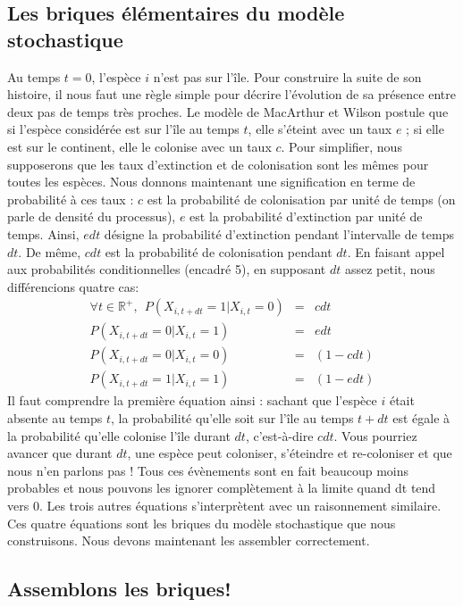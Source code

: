 \subsection{Les briques élémentaires du modèle stochastique}
Au temps $t=0$, l'espèce $i$ n'est pas sur l'île. Pour construire la suite de son histoire, il nous faut une règle simple pour décrire l'évolution de sa présence entre deux pas de temps très proches. Le modèle de MacArthur et Wilson postule que si l'espèce considérée est sur l'île au temps $t$, elle s'éteint avec un taux $e$ ; si elle est sur le continent, elle le colonise avec un taux $c$. Pour simplifier, nous supposerons que les taux d’extinction et de colonisation sont les mêmes pour toutes les espèces. Nous donnons maintenant une signification en terme de probabilité à ces taux : $c$ est la probabilité de colonisation par unité de temps (on parle de densité du processus), $e$ est la probabilité d'extinction par unité de temps. Ainsi, $edt$ désigne la probabilité d'extinction pendant l'intervalle de temps $dt$. De même, $cdt$ est la probabilité de colonisation pendant $dt$. En faisant appel aux probabilités conditionnelles (encadré 5), en supposant $dt$ assez petit, nous différencions quatre cas:
\begin{eqnarray}
 \label{eqAnnI3a}  \forall t \in \mathbb{R}^+, ~~P(X_{i,t+dt}=1|X_{i,t}=0)&=&cdt\\
 \label{eqAnnI3b} P(X_{i,t+dt}=0|X_{i,t}=1)&=&edt \\
 \label{eqAnnI3c} P(X_{i,t+dt}=0|X_{i,t}=0)&=&(1-cdt) \\
   \label{eqAnnI3d} P(X_{i,t+dt}=1|X_{i,t}=1)&=&(1-edt)
\end{eqnarray}
Il faut comprendre la première équation ainsi : sachant que l'espèce $i$ était absente au temps $t$, la probabilité qu'elle soit sur l'île au temps $t+dt$ est égale à la probabilité qu'elle colonise l'île durant $dt$, c'est-à-dire $cdt$. Vous pourriez avancer que durant $dt$, une espèce peut coloniser, s'éteindre et re-coloniser et que nous n'en parlons pas ! Tous ces évènements sont en fait beaucoup moins probables et nous pouvons les ignorer complètement à la limite quand dt tend vers 0. Les trois autres équations s'interprètent avec un raisonnement similaire. Ces quatre équations sont les briques du modèle stochastique que nous construisons. Nous devons maintenant les assembler correctement.


\subsection{Assemblons les briques!}


